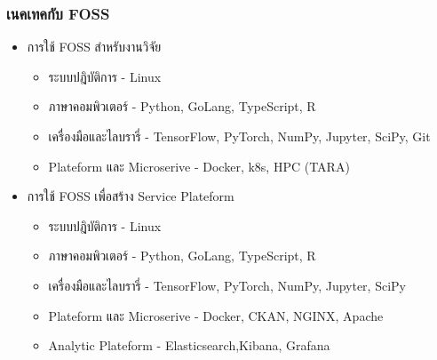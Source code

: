 \begin{frame} [t]
  \frametitle{เนคเทคกับ FOSS}

  \begin{itemize}
    \item การใช้ FOSS สำหรับงานวิจัย
          \begin{itemize}
            \item  ระบบปฎิบัติการ - Linux
            \item ภาษาคอมพิวเตอร์ - Python, GoLang, TypeScript, R
            \item เครื่องมือและไลบรารี่ - TensorFlow, PyTorch, NumPy, Jupyter, SciPy, Git
            \item Plateform และ Microserive - Docker, k8s, HPC (TARA)
          \end{itemize}
    \item การใช้ FOSS เพื่อสร้าง Service Plateform
          \begin{itemize}
            \item  ระบบปฎิบัติการ - Linux
            \item ภาษาคอมพิวเตอร์ - Python, GoLang, TypeScript, R
            \item เครื่องมือและไลบรารี่ - TensorFlow, PyTorch, NumPy, Jupyter, SciPy
            \item Plateform และ Microserive - Docker, CKAN, NGINX, Apache
            \item Analytic Plateform - Elasticsearch,Kibana, Grafana
          \end{itemize}
  \end{itemize}

\end{frame}